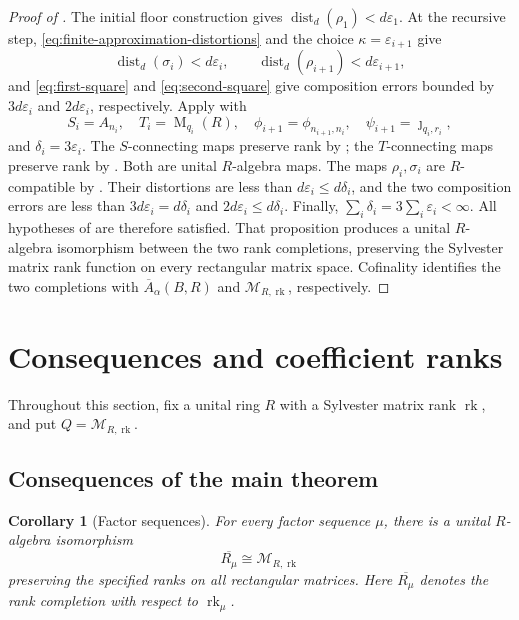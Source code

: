 \documentclass[11pt]{amsart}
\DeclareMathOperator{\rk}{rk}
\DeclareMathOperator{\Mat}{M}
\newtheorem{corollary}[theorem]{Corollary}
\theoremstyle{definition}
\theoremstyle{remark}
\begin{document}
\begin{proof}[Proof of ]
The initial floor construction gives
$\operatorname{dist}_d(\rho_1)<d\varepsilon_1$.
At the recursive step, \eqref{eq:finite-approximation-distortions} and the choice
$\kappa=\varepsilon_{i+1}$ give
\[
 \operatorname{dist}_d(\sigma_i)<d\varepsilon_i,
 \qquad
 \operatorname{dist}_d(\rho_{i+1})<d\varepsilon_{i+1},
\]
and \eqref{eq:first-square} and \eqref{eq:second-square} give composition errors
bounded by
$3d\varepsilon_i$ and $2d\varepsilon_i$, respectively.
Apply  with
\[
 S_i=A_{n_i},\quad T_i=\Mat_{q_i}(R),\quad
 \phi_{i+1}=\phi_{n_{i+1},n_i},\quad
 \psi_{i+1}=\jmath_{q_i,r_i},
\]
and $\delta_i=3\varepsilon_i$.
The $S$-connecting maps preserve rank by ;
the $T$-connecting maps preserve rank by
.
Both are unital $R$-algebra maps.
The maps $\rho_i,\sigma_i$ are $R$-compatible by .
Their distortions are less than $d\varepsilon_i\leq d\delta_i$, and the
two composition errors are less than $3d\varepsilon_i=d\delta_i$ and
$2d\varepsilon_i\leq d\delta_i$.  Finally,
$\sum_i\delta_i=3\sum_i\varepsilon_i<\infty$.
All hypotheses of  are therefore satisfied.
That proposition produces a unital $R$-algebra isomorphism between the two rank
completions, preserving the Sylvester matrix rank function on every rectangular
matrix space.
Cofinality identifies the two completions with $\overline A_\alpha(B,R)$ and
$\mathcal M_{R,\rk}$, respectively.
\end{proof}

\section{Consequences and coefficient ranks}
\label{sec:consequences}

Throughout this section, fix a unital ring $R$ with a Sylvester
matrix rank $\rk$, and put $Q=\mathcal M_{R,\rk}$.

\subsection{Consequences of the main theorem}
\label{subsec:classical-comparison}

\begin{corollary}[Factor sequences]\label{cor:factor-sequence-uniqueness}
For every factor sequence $\mu$, there is a unital $R$-algebra isomorphism
\begin{equation}\label{eq:factor-sequence-completion}
 \overline{R_\mu}\cong\mathcal M_{R,\rk}
\end{equation}
preserving the specified ranks on all rectangular matrices.
Here $\overline{R_\mu}$ denotes the rank completion with respect to $\rk_\mu$.
\end{corollary}
\end{document}
